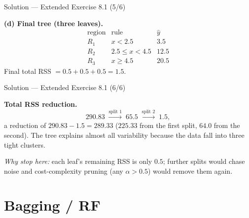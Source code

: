 \documentclass[aspectratio=169,11pt]{beamer}
\begin{document}
\begin{frame}{Solution --- Extended Exercise 8.1 (5/6)}
\begin{solutionbox}
\textbf{(d) Final tree (three leaves).}
\[
\begin{array}{c|c|c}
\text{region} & \text{rule} & \hat y\\\hline
R_1 & x<2.5 & 3.5\\
R_2 & 2.5\le x<4.5 & 12.5\\
R_3 & x\ge4.5 & 20.5
\end{array}
\]
Final total RSS $=0.5+0.5+0.5=1.5$.
\end{solutionbox}
\end{frame}

\begin{frame}{Solution --- Extended Exercise 8.1 (6/6)}
\begin{solutionbox}
\medskip
\textbf{Total RSS reduction.}
\[ 290.83 \;\xrightarrow{\text{split 1}}\; 65.5 \;\xrightarrow{\text{split 2}}\; 1.5, \]
a reduction of $290.83-1.5=\mathbf{289.33}$ ($225.33$ from the first split, $64.0$ from the second). The tree explains almost all variability because the data fall into three tight clusters.

\medskip
\emph{Why stop here:} each leaf's remaining RSS is only $0.5$; further splits would chase noise and cost-complexity pruning (any $\alpha>0.5$) would remove them again.
\end{solutionbox}
\end{frame}







\section{Bagging / RF}
\end{document}
